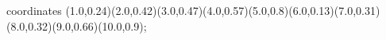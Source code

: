 					coordinates { (1.0,0.24)(2.0,0.42)(3.0,0.47)(4.0,0.57)(5.0,0.8)(6.0,0.13)(7.0,0.31)(8.0,0.32)(9.0,0.66)(10.0,0.9)};
